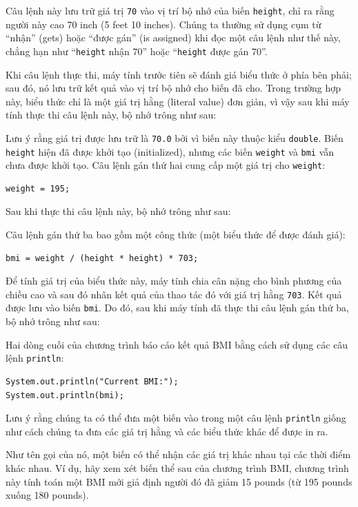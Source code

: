 Câu lệnh này lưu trữ giá trị \texttt{70} vào vị trí bộ nhớ của biến
\texttt{height}, chỉ ra rằng người này cao 70 inch (5 feet 10 inches).
Chúng ta thường sử dụng cụm từ ``nhận'' (gets) hoặc ``được gán'' (is
assigned) khi đọc một câu lệnh như thế này, chẳng hạn như
``\texttt{height} nhận 70'' hoặc ``\texttt{height} được gán 70''.

Khi câu lệnh thực thi, máy tính trước tiên sẽ đánh giá biểu thức ở phía
bên phải; sau đó, nó lưu trữ kết quả vào vị trí bộ nhớ cho biến đã cho.
Trong trường hợp này, biểu thức chỉ là một giá trị hằng (literal value)
đơn giản, vì vậy sau khi máy tính thực thi câu lệnh này, bộ nhớ trông
như sau:

Lưu ý rằng giá trị được lưu trữ là \texttt{70.0} bởi vì biến này thuộc
kiểu \texttt{double}. Biến \texttt{height} hiện đã được khởi tạo
(initialized), nhưng các biến \texttt{weight} và \texttt{bmi} vẫn chưa
được khởi tạo. Câu lệnh gán thứ hai cung cấp một giá trị cho
\texttt{weight}:

\begin{verbatim}
weight = 195;
\end{verbatim}

Sau khi thực thi câu lệnh này, bộ nhớ trông như sau:

Câu lệnh gán thứ ba bao gồm một công thức (một biểu thức để được đánh
giá):

\begin{verbatim}
bmi = weight / (height * height) * 703;
\end{verbatim}

Để tính giá trị của biểu thức này, máy tính chia cân nặng cho bình
phương của chiều cao và sau đó nhân kết quả của thao tác đó với giá trị
hằng \texttt{703}. Kết quả được lưu vào biến \texttt{bmi}. Do đó, sau
khi máy tính đã thực thi câu lệnh gán thứ ba, bộ nhớ trông như sau:

Hai dòng cuối của chương trình báo cáo kết quả BMI bằng cách sử dụng các
câu lệnh \texttt{println}:

\begin{verbatim}
System.out.println("Current BMI:");
System.out.println(bmi);
\end{verbatim}

Lưu ý rằng chúng ta có thể đưa một biến vào trong một câu lệnh
\texttt{println} giống như cách chúng ta đưa các giá trị hằng và các
biểu thức khác để được in ra.

Như tên gọi của nó, một biến có thể nhận các giá trị khác nhau tại các
thời điểm khác nhau. Ví dụ, hãy xem xét biến thể sau của chương trình
BMI, chương trình này tính toán một BMI mới giả định người đó đã giảm 15
pounds (từ 195 pounds xuống 180 pounds).

